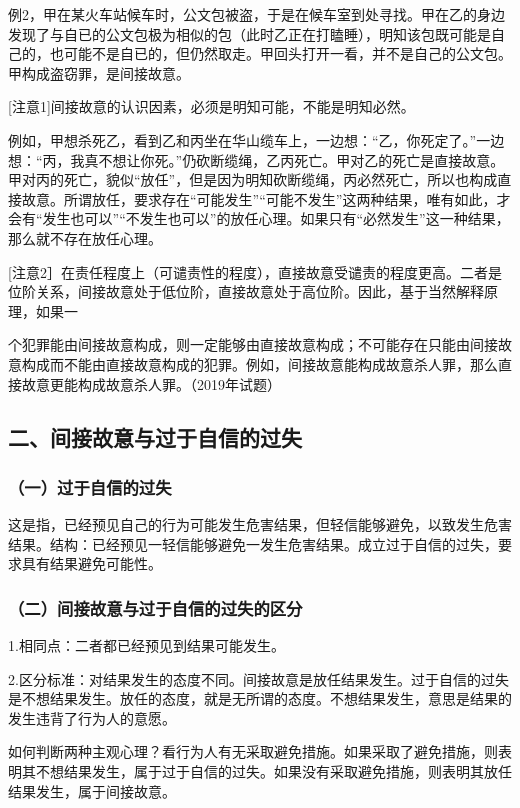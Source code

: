 例2，甲在某火车站候车时，公文包被盗，于是在候车室到处寻找。甲在乙的身边发现了与自已的公文包极为相似的包（此时乙正在打瞌睡），明知该包既可能是自己的，也可能不是自已的，但仍然取走。甲回头打开一看，并不是自己的公文包。甲构成盗窃罪，是间接故意。

[注意1]间接故意的认识因素，必须是明知可能，不能是明知必然。

例如，甲想杀死乙，看到乙和丙坐在华山缆车上，一边想：“乙，你死定了。”一边想：“丙，我真不想让你死。”仍砍断缆绳，乙丙死亡。甲对乙的死亡是直接故意。甲对丙的死亡，貌似“放任”，但是因为明知砍断缆绳，丙必然死亡，所以也构成直接故意。所谓放任，要求存在“可能发生”“可能不发生”这两种结果，唯有如此，才会有“发生也可以”“不发生也可以”的放任心理。如果只有“必然发生”这一种结果，那么就不存在放任心理。

[注意2］在责任程度上（可谴责性的程度），直接故意受谴责的程度更高。二者是位阶关系，间接故意处于低位阶，直接故意处于高位阶。因此，基于当然解释原理，如果一

个犯罪能由间接故意构成，则一定能够由直接故意构成；不可能存在只能由间接故意构成而不能由直接故意构成的犯罪。例如，间接故意能构成故意杀人罪，那么直接故意更能构成故意杀人罪。（2019年试题）

\subsection*{二、间接故意与过于自信的过失}

\subsubsection*{（一）过于自信的过失}

这是指，已经预见自己的行为可能发生危害结果，但轻信能够避免，以致发生危害结果。结构：已经预见一轻信能够避免一发生危害结果。成立过于自信的过失，要求具有结果避免可能性。

\subsubsection*{（二）间接故意与过于自信的过失的区分}

1.相同点：二者都已经预见到结果可能发生。

2.区分标准：对结果发生的态度不同。间接故意是放任结果发生。过于自信的过失是不想结果发生。放任的态度，就是无所谓的态度。不想结果发生，意思是结果的发生违背了行为人的意愿。

如何判断两种主观心理？看行为人有无采取避免措施。如果采取了避免措施，则表明其不想结果发生，属于过于自信的过失。如果没有采取避免措施，则表明其放任结果发生，属于间接故意。

